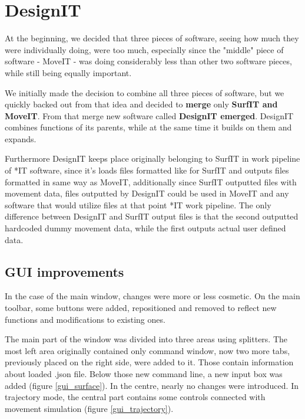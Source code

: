\documentclass[a4paper, 11pt, article]{report}
\begin{document}

\section{DesignIT}

At the beginning, we decided that three pieces of software, seeing how much they were individually doing, were too much, especially since the "middle" piece of software - MoveIT - was doing considerably less than other two software pieces, while still being equally important. 

We initially made the decision to combine all three pieces of software, but we quickly backed out from that idea and decided to \textbf{merge} only \textbf{SurfIT and MoveIT}. From that merge new software called \textbf{DesignIT emerged}. DesignIT combines functions of its parents, while at the same time it builds on them and expands. 

Furthermore DesignIT keeps place originally belonging to SurfIT in work pipeline of *IT software, since it's loads files formatted like for SurfIT and outputs files formatted in same way as MoveIT, additionally since SurfIT outputted files with movement data, files outputted by DesignIT could be used in MoveIT and any software that would utilize files at that point *IT work pipeline. The only difference between DesignIT and SurfIT output files is that the second outputted hardcoded dummy movement data, while the first outputs actual user defined data.

\subsection{GUI improvements}

In the case of the main window, changes were more or less cosmetic. On the main toolbar, some buttons were added, repositioned and removed to reflect new functions and modifications to existing ones. 

The main part of the window was divided into three areas using splitters. The most left area originally contained only command window, now two more tabs, previously placed on the right side, were added to it. Those contain information about loaded .json file. Below those new command line, a new input box was added (figure \ref{gui_surface}). In the centre, nearly no changes were introduced. In trajectory mode, the central part contains some controls connected with movement simulation (figure \ref{gui_trajectory}). 
\end{document}
